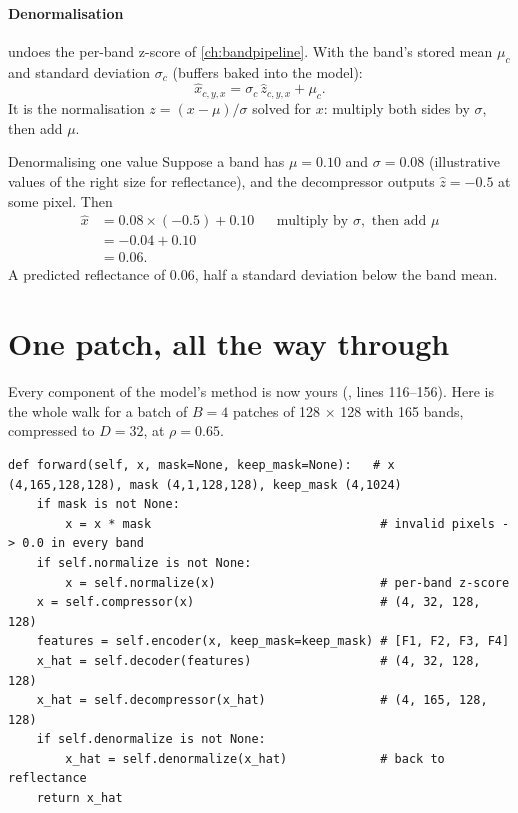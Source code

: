 \paragraph{Denormalisation} undoes the per-band z-score of \cref{ch:bandpipeline}. With the band's
stored mean $\mu_c$ and standard deviation $\sigma_c$ (buffers baked into the model):
\begin{equation}\label{eq:decoder:denorm}
\hat{x}_{c,y,x} = \sigma_c\, \hat{z}_{c,y,x} + \mu_c .
\end{equation}
It is the normalisation $z = (x - \mu)/\sigma$ solved for $x$: multiply both sides by $\sigma$, then add
$\mu$.

\begin{worked}[label={we:decoder:denorm}]{Denormalising one value}
Suppose a band has $\mu = 0.10$ and $\sigma = 0.08$\tagA{} (illustrative values of the right size for
reflectance), and the decompressor outputs $\hat{z} = -0.5$ at some pixel. Then
\begin{align*}
\hat{x} &= 0.08 \times (-0.5) + 0.10 && \text{multiply by } \sigma, \text{ then add } \mu\\
        &= -0.04 + 0.10\\
        &= 0.06 .
\end{align*}
A predicted reflectance of 0.06, half a standard deviation below the band mean.
\end{worked}

\section{One patch, all the way through}\label{sec:decoder:trace}

Every component of the model's  method is now yours
(, lines 116--156). Here is the whole walk for a batch of $B = 4$ patches of 128 $\times$ 128 with 165 bands,
compressed to $D = 32$, at $\rho = 0.65$.

\begin{lstlisting}
def forward(self, x, mask=None, keep_mask=None):   # x (4,165,128,128), mask (4,1,128,128), keep_mask (4,1024)
    if mask is not None:
        x = x * mask                                # invalid pixels -> 0.0 in every band
    if self.normalize is not None:
        x = self.normalize(x)                       # per-band z-score
    x = self.compressor(x)                          # (4, 32, 128, 128)
    features = self.encoder(x, keep_mask=keep_mask) # [F1, F2, F3, F4]
    x_hat = self.decoder(features)                  # (4, 32, 128, 128)
    x_hat = self.decompressor(x_hat)                # (4, 165, 128, 128)
    if self.denormalize is not None:
        x_hat = self.denormalize(x_hat)             # back to reflectance
    return x_hat
\end{lstlisting}

